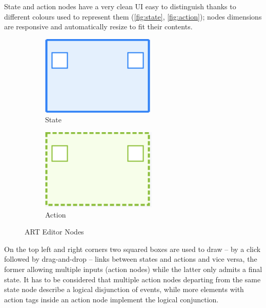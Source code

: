 State and action nodes have a very clean UI easy to distinguish thanks to different colours used to represent them (\autoref{fig:state}, \autoref{fig:action}); nodes dimensions are responsive and automatically resize to fit their contents.
\begin{figure}[h]
    \begin{subfigure}{0.5\textwidth}
        \centering
        \includegraphics{Figures/Editor/state.png}
        \caption{State}
        \label{fig:state}
    \end{subfigure}
    \begin{subfigure}{0.5\textwidth}
        \centering
        \includegraphics{Figures/Editor/action.png}
        \caption{Action}
        \label{fig:action}
    \end{subfigure}
    \caption{ART Editor Nodes}
\end{figure}
On the top left and right corners two squared boxes are used to draw -- by a click followed by drag-and-drop -- links between states and actions and vice versa, the former allowing multiple inputs (action nodes) while the latter only admits a final state. It has to be considered that multiple action nodes departing from the same state node describe a logical disjunction of events, while more elements with action tags inside an action node implement the logical conjunction. 

